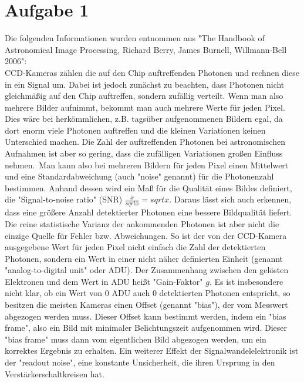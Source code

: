 \section{Aufgabe 1}
Die folgenden Informationen wurden entnommen aus "The Handbook of Astronomical Image Processing, Richard Berry, James Burnell, Willmann-Bell 2006":
\\
CCD-Kameras zählen die auf den Chip auftreffenden Photonen und rechnen diese in ein Signal um. Dabei ist jedoch zunächst zu beachten, dass Photonen nicht gleichmäßig auf den Chip auftreffen, sondern zufällig verteilt. Wenn man also mehrere Bilder aufnimmt, bekommt man auch mehrere Werte für jeden Pixel. Dies wäre bei herkömmlichen, z.B. tagsüber aufgenommenen Bildern egal, da dort enorm viele Photonen auftreffen und die kleinen Variationen keinen Unterschied machen. Die Zahl der auftreffenden Photonen bei astronomischen Aufnahmen ist aber so gering, dass die zufälligen Variationen großen Einfluss nehmen.\
Man kann also bei mehreren Bildern für jeden Pixel einen Mittelwert und eine Standardabweichung (auch "noise" genannt) für die Photonenzahl bestimmen. Anhand dessen wird ein Maß für die Qualität eines Bildes definiert, die "Signal-to-noise ratio" (SNR) $\frac{\overline{x}}{sqrt{\overline{x}}} = sqrt{\overline{x}}$.  Daraus lässt sich auch erkennen, dass eine größere Anzahl detektierter Photonen eine bessere Bildqualität liefert.\\
Die reine statistische Varianz der ankommenden Photonen ist aber nicht die einzige Quelle für Fehler bzw. Abweichungen. So ist der von der CCD-Kamera ausgegebene Wert für jeden Pixel nicht einfach die Zahl der detektierten Photonen, sondern ein Wert in einer nicht näher definierten Einheit (genannt "analog-to-digital unit" oder ADU). Der Zusammenhang zwischen den gelösten Elektronen und dem Wert in ADU heißt "Gain-Faktor" $g$. Es ist insbesondere nicht klar, ob ein Wert von 0 ADU auch 0 detektierten Photonen entspricht, so besitzen die meisten Kameras einen Offset (genannt "bias"), der vom Messwert abgezogen werden muss. Dieser Offset kann bestimmt werden, indem ein "bias frame", also ein Bild mit minimaler Belichtungszeit aufgenommen wird. Dieser "bias frame" muss dann vom eigentlichen Bild abgezogen werden, um ein korrektes Ergebnis zu erhalten. Ein weiterer Effekt der Signalwandelelektronik ist der "readout noise", eine konstante Unsicherheit, die ihren Ursprung in den Verstärkerschaltkreisen hat.
\\
